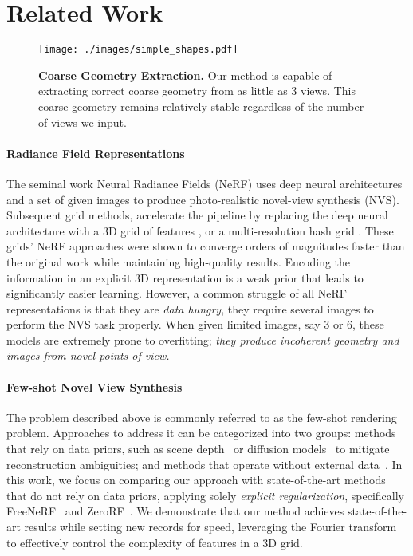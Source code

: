 \section{Related Work}
\label{sec:related_work}

\begin{figure*}[t]
	\centering
	\texttt{[image: ./images/simple\_shapes.pdf]}
	\caption{\textbf{Coarse Geometry Extraction.} Our method is capable of extracting correct coarse geometry from as little as 3 views. This coarse geometry remains relatively stable regardless of the number of views we input.}
    \vspace{-10px}
	\label{fig:coarse-geometry-extraction}
\end{figure*}

\paragraph{Radiance Field Representations}

The seminal work Neural Radiance Fields (NeRF) \cite{mildenhall2020nerf} uses deep neural architectures and a set of given images to produce photo-realistic novel-view synthesis (NVS). Subsequent grid methods, accelerate the pipeline by replacing the deep neural architecture with a 3D grid of features \cite{Chen2022ECCV}, or a multi-resolution hash grid \cite{mueller2022instant}. These grids' NeRF approaches were shown to converge orders of magnitudes faster than the original work while maintaining high-quality results. Encoding the information in an explicit 3D representation is a weak prior that leads to significantly easier learning. However, a common struggle of all NeRF representations is that they are \textit{data hungry}, they require several images to perform the NVS task properly. When given limited images, say 3 or 6, these models are extremely prone to overfitting; \textit{they produce incoherent geometry and images from novel points of view.}

\vspace{-1em}\paragraph{Few-shot Novel View Synthesis}

The problem described above is commonly referred to as the few-shot rendering problem. Approaches to address it can be categorized into two groups: methods that rely on data priors, such as scene depth~\cite{wang2023sparsenerf,zhu2025fsgs,li2024dngaussian} or diffusion models~\cite{wu2024reconfusion} to mitigate reconstruction ambiguities; and methods that operate without external data~\cite{yu2021pixelnerf,chen2021mvsnerf,jain2021putting,seo2023flipnerf,kim2022infonerf,yang2023freenerf,shi2024zerorf}. In this work, we focus on comparing our approach with state-of-the-art methods that do not rely on data priors, applying solely \textit{explicit regularization}, specifically FreeNeRF~\cite{yang2023freenerf} and ZeroRF~\cite{shi2024zerorf}.
We demonstrate that our method achieves state-of-the-art results while setting new records for speed, leveraging the Fourier transform to effectively control the complexity of features in a 3D grid.

